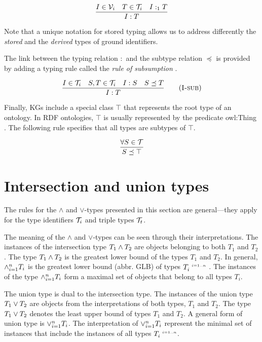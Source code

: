 \documentclass[runningheads]{llncs}
\newcommand{\s}{\scriptscriptstyle\ \,}
\newcommand{\V}{{\cal V}}
\newcommand{\TT}{{\cal T}}
\begin{document}
\begin{equation}
\dfrac{I\in\V_i\quad\/T\in\TT_i\quad\/I:_1\/T}
      {I:T}
\end{equation}

Note that a unique notation for stored typing allows us to address
differently the \emph{stored} and the \emph{derived} types of ground
identifiers.

The link between the typing relation $:$ and the subtype relation
$\preceq$ is provided by adding a typing rule called the \emph{rule of
  subsumption} \cite{Pierce2002}.

\begin{equation}
\dfrac{I\in\TT_i\quad\/S,T\in\TT_i\quad\/I:S\quad\/S\preceq\/T}
      {I:T}    
\tag{\textsc{I-sub}}\label{rule:I-sub}
\end{equation}

Finally, KGs include a special class $\top$ that represents the root
type of an ontology. In RDF ontologies, $\top$ is usually represented
by the predicate owl:Thing \cite{Hoffart2013}. The following rule
specifies that all types are subtypes of $\top$.

\begin{equation}
\dfrac{\forall\/S\in\TT}
      {S\preceq\top}
\end{equation}






\section{Intersection and union types\label{sec:intsc-union}}

The rules for the $\land$ and $\lor$-types presented in this section
are general---they apply for the type identifiers $\TT_i$ and triple
types $\TT_t$.

The meaning of the $\land$ and $\lor$-types can be seen through their
interpretations. The instances of the intersection type
$T_1\land\/T_2$ are objects belonging to both $T_1$ and $T_2$. The
type $T_1\land\/T_2$ is the greatest lower bound of the types $T_1$
and $T_2$. In general, $\land_{i=1}^n\/T_i$ is the greatest lower
bound (abbr. GLB) of types $T_i^{\s\/i=1..n}$
\cite{Pierce1991,Pierce1996}. The instances of the type
$\land_{i=1}^n\/T_i$ form a maximal set of objects that belong to all
types $T_i$.

The union type is dual to the intersection type. The instances of the
union type $T_1\lor\/T_2$ are objects from the interpretations of both
types, $T_1$ and $T_2$. The type $T_1\lor\/T_2$ denotes the least
upper bound of types $T_1$ and $T_2$. A general form of union type is
$\lor_{i=1}^n\/T_i$. The interpretation of $\lor_{i=1}^n\/T_i$
represent the minimal set of instances that include the instances of
all types $T_i^{\s\/i=1..n}$.
\end{document}
